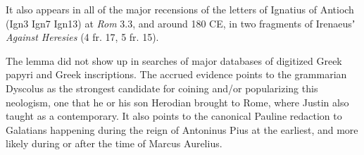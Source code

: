 \noindent{}It also appears in all of the major recensions of the letters of Ignatius of Antioch (Ign3 Ign7 Ign13) %
at \textit{Rom} 3.3, and around 180 CE, in two fragments of %
Irenaeusʼ \textit{Against Heresies} (4 fr. 17, 5 fr. 15).

The lemma did not show up in searches of major databases of digitized Greek papyri and Greek inscriptions. %
The accrued evidence points to the grammarian Dyscolus as the strongest candidate %
for coining and/or popularizing this neologism, %
one that he or his son Herodian brought to Rome, where Justin also taught as a contemporary. %
It also points to the canonical Pauline redaction to Galatians happening during the reign %
of Antoninus Pius at the earliest, and more likely during or after the time of Marcus Aurelius. %
